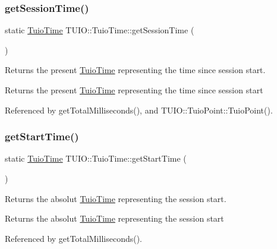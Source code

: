 \subsubsection{\texorpdfstring{get\+Session\+Time()}{getSessionTime()}}
{\footnotesize\ttfamily static \hyperlink{class_t_u_i_o_1_1_tuio_time}{Tuio\+Time} T\+U\+I\+O\+::\+Tuio\+Time\+::get\+Session\+Time (\begin{DoxyParamCaption}{ }\end{DoxyParamCaption})\hspace{0.3cm}{\ttfamily [static]}}

Returns the present \hyperlink{class_t_u_i_o_1_1_tuio_time}{Tuio\+Time} representing the time since session start. \begin{DoxyReturn}{Returns}
the present \hyperlink{class_t_u_i_o_1_1_tuio_time}{Tuio\+Time} representing the time since session start 
\end{DoxyReturn}


Referenced by get\+Total\+Milliseconds(), and T\+U\+I\+O\+::\+Tuio\+Point\+::\+Tuio\+Point().

\mbox{\label{class_t_u_i_o_1_1_tuio_time_a748fb038221433dd33ac52f80d7d9c3e}} 
\subsubsection{\texorpdfstring{get\+Start\+Time()}{getStartTime()}}
{\footnotesize\ttfamily static \hyperlink{class_t_u_i_o_1_1_tuio_time}{Tuio\+Time} T\+U\+I\+O\+::\+Tuio\+Time\+::get\+Start\+Time (\begin{DoxyParamCaption}{ }\end{DoxyParamCaption})\hspace{0.3cm}{\ttfamily [static]}}

Returns the absolut \hyperlink{class_t_u_i_o_1_1_tuio_time}{Tuio\+Time} representing the session start. \begin{DoxyReturn}{Returns}
the absolut \hyperlink{class_t_u_i_o_1_1_tuio_time}{Tuio\+Time} representing the session start 
\end{DoxyReturn}


Referenced by get\+Total\+Milliseconds().

\mbox{\label{class_t_u_i_o_1_1_tuio_time_aec89a336368b34d217f571942de40955}} 
